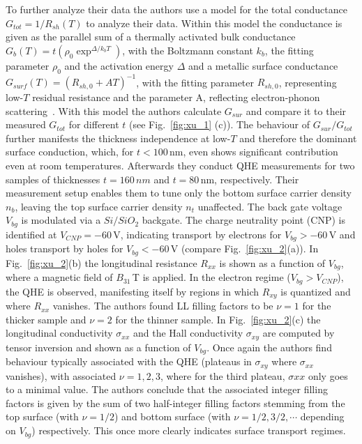 \documentclass[twocolumn,10pt,a4paper]{article}
\begin{document}
To further analyze their data the authors use a model for the total conductance $G_{tot} = 1/R_{sh}(T)$ to analyze their data. Within this model the conductance is given as the parallel sum of a thermally activated bulk conductance $G_{b}(T)=t\left(\rho_0 \exp^{\Delta/k_b T}\right)$, with the Boltzmann constant $k_b$, the fitting parameter $\rho_0$ and the activation energy $\Delta$ and a metallic surface conductance $G_{surf}(T)= (R_{sh,0} + AT)^{-1}$, with the fitting parameter $R_{sh,0}$, representing low-$T$ residual resistance and the parameter A, reflecting electron-phonon scattering~\cite{Xu_2014}. With this model the authors calculate $G_{sur}$ and compare it to their measured $G_{tot}$ for different $t$ (see Fig.\@~\ref{fig:xu_1} (c)). The behaviour of $G_{sur}/G_{tot}$ further manifests the thickness independence at low-$T$ and therefore the dominant surface conduction, which, for $t<100\,$nm, even shows significant contribution even at room temperatures. 
Afterwards they conduct QHE measurements for two samples of thicknesses $t=160\,nm$ and $t=80\,$nm, respectively. Their measurement setup enables them to tune only the bottom surface carrier density $n_b$, leaving the top surface carrier density $n_t$ unaffected. The back gate voltage $V_{bg}$ is modulated via a $Si/SiO_2$ backgate. The charge neutrality point (CNP) is identified at $V_{CNP}=-60\,$V, indicating transport by electrons for $V_{bg}>-60\,$V and holes transport by holes for $V_{bg}<-60\,$V (compare Fig.\@~\ref{fig:xu_2}(a)). In Fig.\@~\ref{fig:xu_2}(b) the longitudinal resistance $R_{xx}$ is shown as a function of $V_{bg}$, where a magnetic field of $B_31\,$T is applied. In the electron regime ($V_{bg}>V_{CNP}$), the QHE is observed, manifesting itself by regions in which $R_{xy}$ is quantized and where $R_{xx}$ vanishes. The authors found LL filling factors to be $\nu=1$ for the thicker sample and $\nu=2$ for the thinner sample. In Fig.\@~\ref{fig:xu_2}(c) the longitudinal conductivity $\sigma_{xx}$ and the Hall conductivity $\sigma_{xy}$ are computed by tensor inversion and shown as a function of $V_{bg}$. Once again the authors find behaviour typically associated with the QHE (plateaus in $\sigma_{xy}$ where $\sigma_{xx}$ vanishes), with associated $\nu=1,2,3$, where for the third plateau, $\sigma{xx}$ only goes to a minimal value. The authors conclude that the associated integer filling factors is given by the sum of two half-integer filling factors stemming from the top surface (with $\nu=1/2$) and bottom surface (with $\nu=1/2,3/2,\cdots$ depending on $V_{bg}$) respectively. This once more clearly indicates surface transport regimes.
\end{document}
